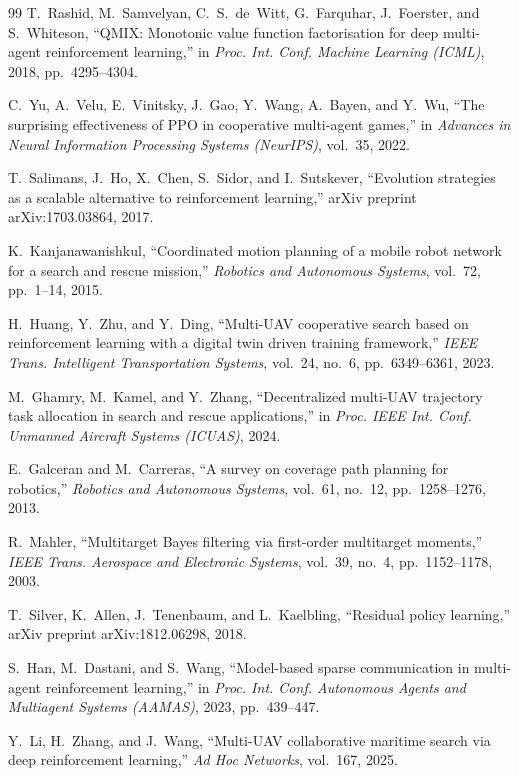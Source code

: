 \documentclass[journal]{IEEEtran}
\begin{document}
\begin{thebibliography}{99}
T.~Rashid, M.~Samvelyan, C.~S.~de~Witt, G.~Farquhar, J.~Foerster, and S.~Whiteson,
``QMIX: Monotonic value function factorisation for deep multi-agent reinforcement learning,''
in \emph{Proc. Int. Conf. Machine Learning (ICML)}, 2018, pp.~4295--4304.

C.~Yu, A.~Velu, E.~Vinitsky, J.~Gao, Y.~Wang, A.~Bayen, and Y.~Wu,
``The surprising effectiveness of PPO in cooperative multi-agent games,''
in \emph{Advances in Neural Information Processing Systems (NeurIPS)}, vol.~35, 2022.

T.~Salimans, J.~Ho, X.~Chen, S.~Sidor, and I.~Sutskever,
``Evolution strategies as a scalable alternative to reinforcement learning,''
arXiv preprint arXiv:1703.03864, 2017.

K.~Kanjanawanishkul,
``Coordinated motion planning of a mobile robot network for a search and rescue mission,''
\emph{Robotics and Autonomous Systems}, vol.~72, pp.~1--14, 2015.

H.~Huang, Y.~Zhu, and Y.~Ding,
``Multi-UAV cooperative search based on reinforcement learning with a digital twin driven training framework,''
\emph{IEEE Trans. Intelligent Transportation Systems}, vol.~24, no.~6, pp.~6349--6361, 2023.

M.~Ghamry, M.~Kamel, and Y.~Zhang,
``Decentralized multi-UAV trajectory task allocation in search and rescue applications,''
in \emph{Proc. IEEE Int. Conf. Unmanned Aircraft Systems (ICUAS)}, 2024.

E.~Galceran and M.~Carreras,
``A survey on coverage path planning for robotics,''
\emph{Robotics and Autonomous Systems}, vol.~61, no.~12, pp.~1258--1276, 2013.

R.~Mahler,
``Multitarget Bayes filtering via first-order multitarget moments,''
\emph{IEEE Trans. Aerospace and Electronic Systems}, vol.~39, no.~4, pp.~1152--1178, 2003.

T.~Silver, K.~Allen, J.~Tenenbaum, and L.~Kaelbling,
``Residual policy learning,''
arXiv preprint arXiv:1812.06298, 2018.

S.~Han, M.~Dastani, and S.~Wang,
``Model-based sparse communication in multi-agent reinforcement learning,''
in \emph{Proc. Int. Conf. Autonomous Agents and Multiagent Systems (AAMAS)}, 2023, pp.~439--447.

Y.~Li, H.~Zhang, and J.~Wang,
``Multi-UAV collaborative maritime search via deep reinforcement learning,''
\emph{Ad Hoc Networks}, vol.~167, 2025.


\end{thebibliography}
\end{document}
